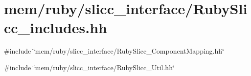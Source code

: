 \hypertarget{RubySlicc__includes_8hh}{
\section{mem/ruby/slicc\_\-interface/RubySlicc\_\-includes.hh}
\label{RubySlicc__includes_8hh}
}
{\ttfamily \#include \char`\"{}mem/ruby/slicc\_\-interface/RubySlicc\_\-ComponentMapping.hh\char`\"{}}\par
{\ttfamily \#include \char`\"{}mem/ruby/slicc\_\-interface/RubySlicc\_\-Util.hh\char`\"{}}\par
